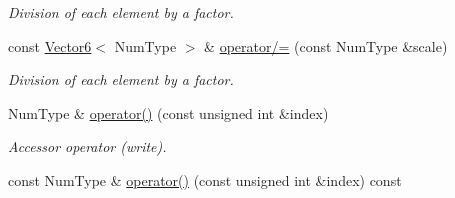 \begin{DoxyCompactItemize}
\begin{DoxyCompactList}\small\item\em Division of each element by a factor. \end{DoxyCompactList}\item 
\hypertarget{singletonscrews_1_1_vector6_a72959eaf251ab113a21ee66a077c32d7}{const \hyperlink{singletonscrews_1_1_vector6}{Vector6}$<$ Num\+Type $>$ \& \hyperlink{singletonscrews_1_1_vector6_a72959eaf251ab113a21ee66a077c32d7}{operator/=} (const Num\+Type \&scale)}\label{singletonscrews_1_1_vector6_a72959eaf251ab113a21ee66a077c32d7}

\begin{DoxyCompactList}\small\item\em Division of each element by a factor. \end{DoxyCompactList}\item 
Num\+Type \& \hyperlink{singletonscrews_1_1_vector6_a2a3338c104ce137eb1686d1445114a39}{operator()} (const unsigned int \&index)
\begin{DoxyCompactList}\small\item\em Accessor operator (write). \end{DoxyCompactList}\item 
\hypertarget{singletonscrews_1_1_vector6_a4fb6f77a018894adb4051f0ca5dcc6d9}{const Num\+Type \& \hyperlink{singletonscrews_1_1_vector6_a4fb6f77a018894adb4051f0ca5dcc6d9}{operator()} (const unsigned int \&index) const }\label{singletonscrews_1_1_vector6_a4fb6f77a018894adb4051f0ca5dcc6d9}


\end{DoxyCompactItemize}
